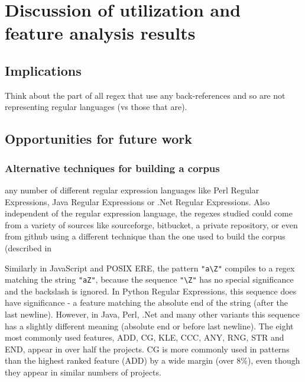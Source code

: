 \section{Discussion of utilization and feature analysis results}
\label{sec:featureDiscussion}


\subsection{Implications}
Think about the part of all regex that use any back-references and so are not representing regular languages (vs those that are).
\subsection{Opportunities for future work}

\subsubsection{Alternative techniques for building a corpus}
\label{sec:alternateCorpus}
any number of different regular expression languages like Perl Regular Expressions, Java Regular Expressions or .Net Regular Expressions.  Also independent of the regular expression language, the regexes studied could come from a variety of sources like sourceforge, bitbucket, a private repository, or even from github using a different technique than the one used to build the corpus (described in




Similarly in JavaScript and POSIX ERE, the pattern \verb!"a\Z"! compiles to a regex matching the string \verb!"aZ"!, because the sequence \verb!"\Z"! has no special significance and the backslash is ignored.  In Python Regular Expressions, this sequence does have significance - a feature matching the absolute end of the string (after the last newline).  However, in Java, Perl, .Net and many other variants this sequence has a slightly different meaning (absolute end or before last newline).
The eight most commonly used features, ADD, CG, KLE, CCC, ANY, RNG, STR and END,
appear in over half the projects.
CG is more commonly used in patterns than the highest ranked feature (ADD) by a wide margin (over 8\%), even though they appear in similar numbers of projects.


